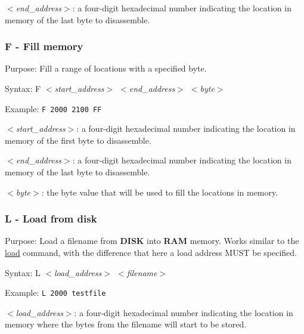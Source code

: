         \hspace{1cm}\textit{$<$end\_address$>$}: a four-digit hexadecimal
        number indicating the location in memory of the last byte to
        disassemble.

        \subsubsection{F - Fill memory}

        Purpose: Fill a range of locations with a specified byte.

        Syntax: F \textit{$<$start\_address$>$ $<$end\_address$>$ $<$byte$>$}

        Example: \texttt{F 2000 2100 FF}

        \hspace{1cm}\textit{$<$start\_address$>$}: a four-digit hexadecimal
        number indicating the location in memory of the first byte to
        disassemble.

        \hspace{1cm}\textit{$<$end\_address$>$}: a four-digit hexadecimal
        number indicating the location in memory of the last byte to
        disassemble.

        \hspace{1cm}\textit{$<$byte$>$}: the byte value that will be used to
        fill the locations in memory.

        \subsubsection{L - Load from disk}

        Purpose: Load a filename from \textbf{DISK} into \textbf{RAM} memory.
        Works similar to the \hyperref[cmd:load]{load} command, with the
        difference that here a load address MUST be specified.

        Syntax: L \textit{$<$load\_address$>$ $<$filename$>$}

        Example: \texttt{L 2000 testfile}

        \hspace{1cm}\textit{$<$load\_address$>$}: a four-digit hexadecimal
        number indicating the location in memory where the bytes from the
        filename will start to be stored.

